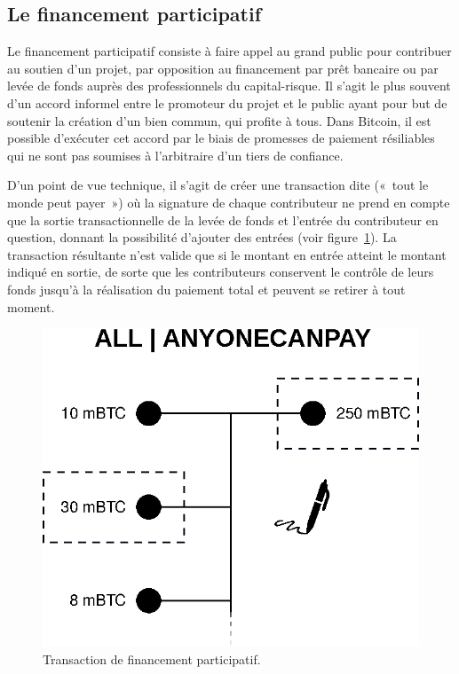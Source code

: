 
\subsection{Le financement participatif} Le financement participatif consiste à faire appel au grand public pour contribuer au soutien d'un projet, par opposition au financement par prêt bancaire ou par levée de fonds auprès des professionnels du capital-risque. Il s'agit le plus souvent d'un accord informel entre le promoteur du projet et le public ayant pour but de soutenir la création d'un bien commun, qui profite à tous. Dans Bitcoin, il est possible d'exécuter cet accord par le biais de promesses de paiement résiliables qui ne sont pas soumises à l'arbitraire d'un tiers de confiance.

D'un point de vue technique, il s'agit de créer une transaction dite  («~tout le monde peut payer~») où la signature de chaque contributeur ne prend en compte que la sortie transactionnelle de la levée de fonds et l'entrée du contributeur en question, donnant la possibilité d'ajouter des entrées (voir figure~\ref{fig:sighash-anyonecanpay}). La transaction résultante n'est valide que si le montant en entrée atteint le montant indiqué en sortie, de sorte que les contributeurs conservent le contrôle de leurs fonds jusqu'à la réalisation du paiement total et peuvent se retirer à tout moment.

\begin{figure}[ht]
  \centering
  \includegraphics[scale=0.65]{img/sighash-anyonecanpay.eps}
  \caption{Transaction de financement participatif.}
  \label{fig:sighash-anyonecanpay}
\end{figure}

